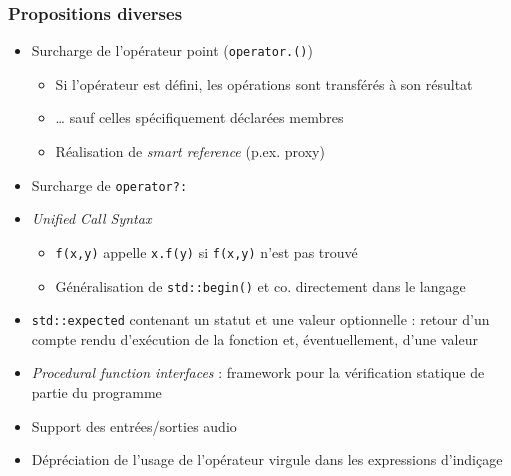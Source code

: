 \documentclass[C++.tex]{subfiles}
\begin{document}
\begin{frame}
	\frametitle{Propositions diverses}
	\begin{itemize}
		\item Surcharge de l'opérateur point (\lstinline|operator.()|)
		\begin{itemize}
			\item Si l'opérateur est défini, les opérations sont transférés à son résultat
			\item \ldots{} sauf celles spécifiquement déclarées membres
			\item Réalisation de \og \textit{smart reference}\fg{} (p.ex. proxy)
		\end{itemize}
		\item Surcharge de \lstinline|operator?:|
		\item \textit{Unified Call Syntax}
		\begin{itemize}
			\item \lstinline|f(x,y)| appelle \lstinline|x.f(y)| si \lstinline|f(x,y)| n'est pas trouvé
			\item Généralisation de \lstinline|std::begin()| et co. directement dans le langage
		\end{itemize}
		\item \lstinline|std::expected| contenant un statut et une valeur optionnelle : retour d'un compte rendu d'exécution de la fonction et, éventuellement, d'une valeur


		\item \textit{Procedural function interfaces} : framework pour la vérification statique de partie du programme


		\item Support des entrées/sorties audio
		\item Dépréciation de l'usage de l'opérateur virgule dans les expressions d'indiçage

	\end{itemize}
\end{frame}
\end{document}
